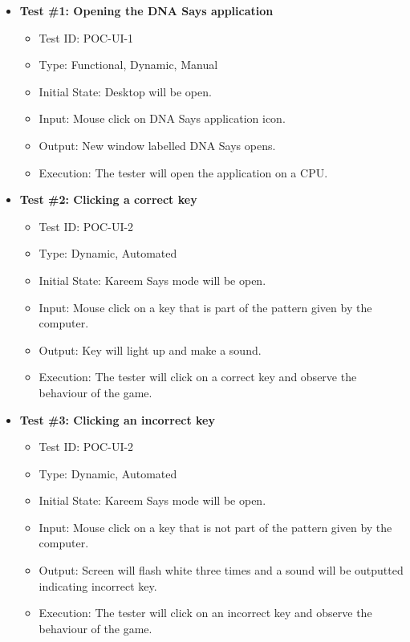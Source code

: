 \documentclass[12pt, titlepage]{article}
\begin{document}
\begin{itemize}

\item \textbf{Test \#1: Opening the DNA Says application}
\begin{itemize}
\item Test ID: POC-UI-1
\item Type: Functional, Dynamic, Manual		
\item Initial State: Desktop will be open. 					
\item Input: Mouse click on DNA Says application icon. 					
\item Output: New window labelled DNA Says opens.					
\item Execution: The tester will open the application on a CPU. 
\end{itemize}

\item \textbf{Test \#2: Clicking a correct key}
\begin{itemize}
\item Test ID: POC-UI-2 
\item Type: Dynamic, Automated		
\item Initial State: Kareem Says mode will be open. 					
\item Input: Mouse click on a key that is part of the pattern given by the computer.					
\item Output: Key will light up and make a sound. 					
\item Execution: The tester will click on a correct key and observe the behaviour of the game.
\end{itemize}

\item \textbf{Test \#3: Clicking an incorrect key}
\begin{itemize}
\item Test ID: POC-UI-2 
\item Type: Dynamic, Automated		
\item Initial State: Kareem Says mode will be open.					
\item Input: Mouse click on a key that is not part of the pattern given by the computer. 					
\item Output: Screen will flash white three times and a sound will be outputted indicating incorrect key. 					
\item Execution: The tester will click on an incorrect key and observe the behaviour of the game.
\end{itemize}

\end{itemize}
\end{document}
